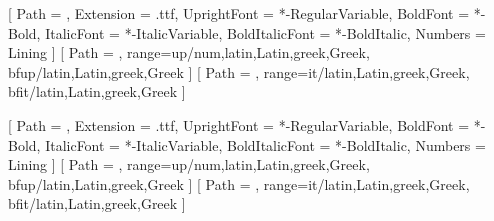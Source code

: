 \usepackage{iftex}
\ifXeTeX
  \usepackage{fontspec}
  \usepackage{unicode-math}
  \ifdefined\fontdir\else\def\fontdir{}\fi
  \setmainfont{Inter}[
    Path = \fontdir,
    Extension = .ttf,
    UprightFont = *-RegularVariable,
    BoldFont = *-Bold,
    ItalicFont = *-ItalicVariable,
    BoldItalicFont = *-BoldItalic,
    Numbers = Lining
  ]
  [
    Path = \fontdir,
    range={up/{num,latin,Latin,greek,Greek}, 
    	bfup/{latin,Latin,greek,Greek}}
  ]
  [
    Path = \fontdir,
    range={it/{latin,Latin,greek,Greek}, 
    	bfit/{latin,Latin,greek,Greek}}
  ]
\else\ifLuaTeX
  \usepackage{fontspec}
  \usepackage{unicode-math}
  \ifdefined\fontdir\else\def\fontdir{}\fi
  \setmainfont{Inter}[
    Path = \fontdir,
    Extension = .ttf,
    UprightFont = *-RegularVariable,
    BoldFont = *-Bold,
    ItalicFont = *-ItalicVariable,
    BoldItalicFont = *-BoldItalic,
    Numbers = Lining
  ]
  [
    Path = \fontdir,
    range={up/{num,latin,Latin,greek,Greek}, 
    	bfup/{latin,Latin,greek,Greek}}
  ]
  [
    Path = \fontdir,
    range={it/{latin,Latin,greek,Greek}, 
    	bfit/{latin,Latin,greek,Greek}}
  ]
\else
  \usepackage{lmodern}
\fi\fi